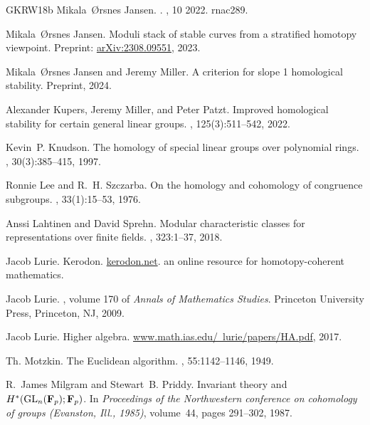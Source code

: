 \documentclass[12pt, reqno]{amsart}
\theoremstyle{plain}
\theoremstyle{definition}
\begin{document}
\begin{thebibliography}{GKRW18b}
Mikala~{\O}rsnes Jansen.
.
, 10 2022.
\newblock rnac289.

Mikala~{\O}rsnes Jansen.
\newblock Moduli stack of stable curves from a stratified homotopy viewpoint.
\newblock Preprint:
  \href{https://arxiv.org/pdf/2308.09551.pdf}{arXiv:2308.09551}, 2023.

Mikala~{\O}rsnes Jansen and Jeremy Miller.
\newblock A criterion for slope 1 homological stability.
\newblock Preprint, 2024.

Alexander Kupers, Jeremy Miller, and Peter Patzt.
\newblock Improved homological stability for certain general linear groups.
, 125(3):511--542, 2022.

Kevin~P. Knudson.
\newblock The homology of special linear groups over polynomial rings.
, 30(3):385--415, 1997.

Ronnie Lee and R.~H. Szczarba.
\newblock On the homology and cohomology of congruence subgroups.
, 33(1):15--53, 1976.

Anssi Lahtinen and David Sprehn.
\newblock Modular characteristic classes for representations over finite
  fields.
, 323:1--37, 2018.

Jacob Lurie.
\newblock Kerodon.
\newblock \href{https://kerodon.net/}{kerodon.net}.
\newblock an online resource for homotopy-coherent mathematics.

Jacob Lurie.
, volume 170 of {\em Annals of Mathematics
  Studies}.
\newblock Princeton University Press, Princeton, NJ, 2009.

Jacob Lurie.
\newblock Higher algebra.
\newblock
  \href{https://www.math.ias.edu/~lurie/papers/HA.pdf}{www.math.ias.edu/~lurie/papers/HA.pdf},
  2017.

Th. Motzkin.
\newblock The {E}uclidean algorithm.
, 55:1142--1146, 1949.

R.~James Milgram and Stewart~B. Priddy.
\newblock Invariant theory and {$H^\ast({\rm GL}_n({\bf F}_p); {\bf F}_p)$}.
\newblock In {\em Proceedings of the {N}orthwestern conference on cohomology of
  groups ({E}vanston, {I}ll., 1985)}, volume~44, pages 291--302, 1987.


\end{thebibliography}
\end{document}
